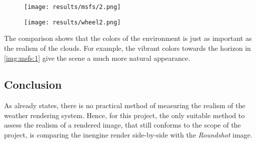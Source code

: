 \begin{figure}[H]
    \centering
        \begin{minipage}{0.47\linewidth}
            \texttt{[image: results/msfs/2.png]}
            \label{img:msfs:1}
        \end{minipage}
    \hfill
        \begin{minipage}{0.47\linewidth}
            \texttt{[image: results/wheel2.png]}
            \label{img:msfs:2}
        \end{minipage}
\end{figure}

\noindent
The comparison shows that the colors of the environment is just as important as the realism of the clouds.
For example, the vibrant colors towards the horizon in \autoref{img:msfs:1} give the scene a much more natural appearance.

\subsection{Conclusion}
As  already states, there is no practical method of measuring the realism of the weather rendering system.
Hence, for this project, the only suitable method to assess the realism of a rendered image, that still conforms to the scope of the project, is comparing the \gls{inengine} render side-by-side with the \emph{Roundshot} image.
